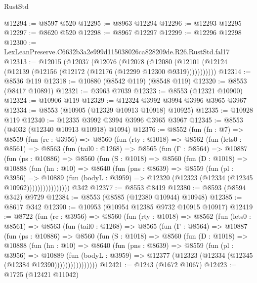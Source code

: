 \begin{lexlean}{RustStd}
\begin{coremodule}
@12294 := @8597 @520
@12295 := @8963 @12294
@12296 := @12293 @12295
@12297 := @8620 @520
@12298 := @8967 @12297
@12299 := @12296 @12298
@12300 := LexLeanPreserve.C6632b3a2e999d115038026ca828209de.R26.RustStd.fal17
@12313 := @12015
    (@12037
      (@12076
        (@12078
          (@12080 (@12101 (@12124 (@12139 (@12156 (@12172 (@12176 (@12299 @12300 @9319)))))))))))
@12314 := @8536 @119
@12318 := @10880 (@8542 @119) (@8548 @119)
@12320 := @8553 (@8417 @10891)
@12321 := @3963 @7039
@12323 := @8553 (@12321 @10900)
@12324 := @10906 @119
@12329 := @12324 @3992 @3994 @3996 @3965 @3967
@12334 := @8553 (@10905 (@12329 @10913 @10918) @10925)
@12335 := @10928 @119
@12340 := @12335 @3992 @3994 @3996 @3965 @3967
@12345 := @8553 (@4032 (@12340 @10913 @10918) @1094)
@12376 := @8552
    (fun (fn : @7) =>
    @8559
      (fun (rc : @3956) =>
      @8560
        (fun (rty : @1018) =>
        @8562
          (fun (lets0 : @8561) =>
          @8563
            (fun (tail0 : @1268) =>
            @8565
              (fun (Γ : @8564) =>
              @10887
                (fun (ps : @10886) =>
                @8560
                  (fun (S : @1018) =>
                  @8560
                    (fun (D : @1018) =>
                    @10888
                      (fun (hn : @10) =>
                      @8640
                        (fun (pns : @8639) =>
                        @8559
                          (fun (pl : @3956) =>
                          @10889
                            (fun (bodyL : @3959) =>
                            @12320 (@12323 (@12334 (@12345 @10962))))))))))))))))
    @342
@12377 := @8553 @8419
@12380 := @8593 (@8594 @342) @9729
@12384 := @8553 (@8585 (@12380 @10944) @10948)
@12385 := @8617 @342
@12390 := @10953 (@10954 @12385 @9732 @10915 @10917)
@12419 := @8722
    (fun (rc : @3956) =>
    @8560
      (fun (rty : @1018) =>
      @8562
        (fun (lets0 : @8561) =>
        @8563
          (fun (tail0 : @1268) =>
          @8565
            (fun (Γ : @8564) =>
            @10887
              (fun (ps : @10886) =>
              @8560
                (fun (S : @1018) =>
                @8560
                  (fun (D : @1018) =>
                  @10888
                    (fun (hn : @10) =>
                    @8640
                      (fun (pns : @8639) =>
                      @8559
                        (fun (pl : @3956) =>
                        @10889
                          (fun (bodyL : @3959) =>
                          @12377 (@12323 (@12334 (@12345 (@12384 @12390))))))))))))))))
@12421 := @1243 (@1672 @1067)
@12423 := @1725 (@12421 @11042)

\end{coremodule}
\end{lexlean}
